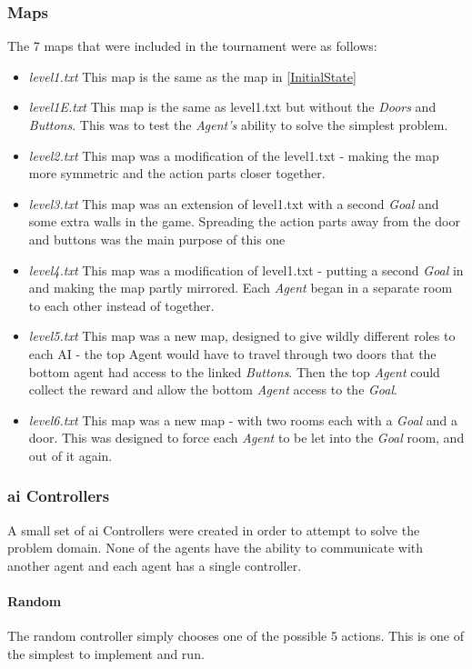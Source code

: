 \documentclass{IEEEtran}
\begin{document}
\subsubsection{Maps}
The 7 maps that were included in the tournament were as follows:
\begin{itemize}
\item{\emph{level1.txt} This map is the same as the map in \ref{InitialState}}
\item{\emph{level1E.txt} This map is the same as level1.txt but without the \emph{Doors} and \emph{Buttons}. This was to test the \emph{Agent's} ability to solve the simplest problem.}
\item{\emph{level2.txt} This map was a modification of the level1.txt - making the map more symmetric and the action parts closer together.}
\item{\emph{level3.txt} This map was an extension of level1.txt with a second \emph{Goal} and some extra walls in the game. Spreading the action parts away from the door and buttons was the main purpose of this one}
\item{\emph{level4.txt} This map was a modification of level1.txt - putting a second \emph{Goal} in and making the map partly mirrored. Each \emph{Agent} began in a separate room to each other instead of together.}
\item{\emph{level5.txt} This map was a new map, designed to give wildly different roles to each AI - the top Agent would have to travel through two doors that the bottom agent had access to the linked \emph{Buttons}. Then the top \emph{Agent} could collect the reward and allow the bottom \emph{Agent} access to the \emph{Goal}.}
\item{\emph{level6.txt} This map was a new map - with two rooms each with a \emph{Goal} and a door. This was designed to force each \emph{Agent} to be let into the \emph{Goal} room, and out of it again.}
\end{itemize}

\subsubsection{\gls{ai} Controllers}
A small set of \gls{ai} Controllers were created in order to attempt to solve the problem domain. None of the agents have the ability to communicate with another agent and each agent has a single controller.
\paragraph{Random}
The random controller simply chooses one of the possible 5 actions. This is one of the simplest to implement and run.

\end{document}
